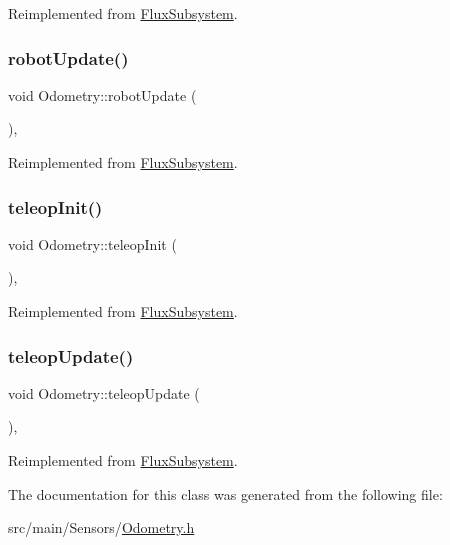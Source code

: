 Reimplemented from \hyperlink{classFluxSubsystem_aacd5ddfcadda0866d5e838de09a60d63}{Flux\+Subsystem}.

\mbox{\label{classOdometry_a4c82fa784546795d6b0bf32c1b919202}} 
\subsubsection{\texorpdfstring{robot\+Update()}{robotUpdate()}}
{\footnotesize\ttfamily void Odometry\+::robot\+Update (\begin{DoxyParamCaption}{ }\end{DoxyParamCaption})\hspace{0.3cm}{\ttfamily [override]}, {\ttfamily [virtual]}}



Reimplemented from \hyperlink{classFluxSubsystem_ac2b1c08b53251870e945edf7080c1549}{Flux\+Subsystem}.

\mbox{\label{classOdometry_adea396ff746c1f3ad73ea79d19a75356}} 
\subsubsection{\texorpdfstring{teleop\+Init()}{teleopInit()}}
{\footnotesize\ttfamily void Odometry\+::teleop\+Init (\begin{DoxyParamCaption}{ }\end{DoxyParamCaption})\hspace{0.3cm}{\ttfamily [override]}, {\ttfamily [virtual]}}



Reimplemented from \hyperlink{classFluxSubsystem_aec6d05e4f80c3783684598fb92ad2e55}{Flux\+Subsystem}.

\mbox{\label{classOdometry_ae42a153c786b5c805b073509394951f9}} 
\subsubsection{\texorpdfstring{teleop\+Update()}{teleopUpdate()}}
{\footnotesize\ttfamily void Odometry\+::teleop\+Update (\begin{DoxyParamCaption}{ }\end{DoxyParamCaption})\hspace{0.3cm}{\ttfamily [override]}, {\ttfamily [virtual]}}



Reimplemented from \hyperlink{classFluxSubsystem_a327d76affc60699bfa62563e364e42f5}{Flux\+Subsystem}.



The documentation for this class was generated from the following file\+:\begin{DoxyCompactItemize}
\item 
src/main/\+Sensors/\hyperlink{Odometry_8h}{Odometry.\+h}\end{DoxyCompactItemize}

